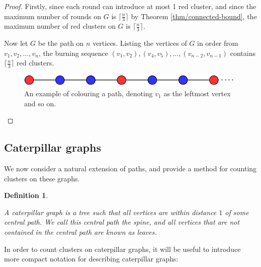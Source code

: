 \documentclass{mpaper}
\newtheorem{definition}[theorem]{Definition}
\begin{document}
\begin{proof}

Firstly, since each round can introduce at most 1 red cluster, and since the maximum number of rounds on $G$ is $\lceil \frac{n}{3} \rceil$ by Theorem \ref{thm/connected-bound}, the maximum number of red clusters on $G$ is $\lceil \frac{n}{3} \rceil$.

Now let $G$ be the path on $n$ vertices. Listing the vertices of $G$ in order from $v_1, v_2, \dots, v_n$, the burning sequence $(v_1, v_2), (v_4, v_5), \dots, (v_{n-2}, v_{n-1})$ contains $\lceil \frac{n}{3} \rceil$ red clusters.

\begin{figure}
    \centering
    \includegraphics[scale=0.65]{mpaper/figures/PathColouring.pdf}
    \caption{An example of colouring a path, denoting $v_1$ as the leftmost vertex and so on.}
    \label{fig/path-colouring}
\end{figure}

\end{proof}

\subsection{Caterpillar graphs}

We now consider a natural extension of paths, and provide a method for counting clusters on these graphs.

\begin{definition}
  \label{def/caterpillars}

  A \emph{caterpillar graph} is a tree such that all vertices are within distance $1$ of some central path. We call this central path the \emph{spine}, and all vertices that are not contained in the central path are known as \emph{leaves}.
  
\end{definition}

In order to count clusters on caterpillar graphs, it will be useful to introduce more compact notation for describing caterpillar graphs:
\end{document}
